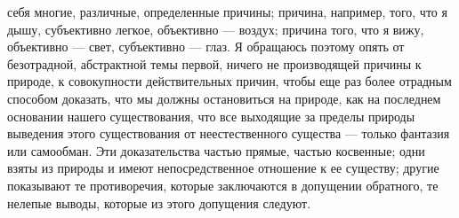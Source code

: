 \documentclass[12pt]{article}
\begin{document}
себя многие, различные, определенные причины; причина, например, того, что я дышу, субъективно легкое, объективно --- воздух; причина того, что я вижу, объективно --- свет, субъективно --- глаз. Я обращаюсь поэтому опять от безотрадной, абстрактной темы первой, ничего не производящей причины к природе, к совокупности действительных причин, чтобы еще раз более отрадным способом доказать, что мы должны остановиться на природе, как на последнем основании нашего существования, что все выходящие за пределы природы выведения этого существования от неестественного существа --- только фантазия или самообман. Эти доказательства частью прямые, частью косвенные; одни взяты из природы и имеют непосредственное отношение к ее существу; другие показывают те противоречия, которые заключаются в допущении обратного, те нелепые выводы, которые из этого допущения следуют. 
\end{document}
